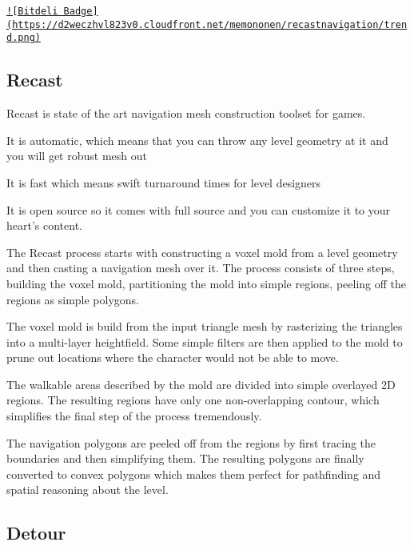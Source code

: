\href{https://bitdeli.com/free}{\tt !\mbox{[}Bitdeli Badge\mbox{]}(https\+://d2weczhvl823v0.\+cloudfront.\+net/memononen/recastnavigation/trend.\+png)}



\subsection*{Recast}

Recast is state of the art navigation mesh construction toolset for games.


\begin{DoxyItemize}
\item It is automatic, which means that you can throw any level geometry at it and you will get robust mesh out
\item It is fast which means swift turnaround times for level designers
\item It is open source so it comes with full source and you can customize it to your heart's content.
\end{DoxyItemize}

The Recast process starts with constructing a voxel mold from a level geometry and then casting a navigation mesh over it. The process consists of three steps, building the voxel mold, partitioning the mold into simple regions, peeling off the regions as simple polygons.


\begin{DoxyEnumerate}
\item The voxel mold is build from the input triangle mesh by rasterizing the triangles into a multi-\/layer heightfield. Some simple filters are then applied to the mold to prune out locations where the character would not be able to move.
\item The walkable areas described by the mold are divided into simple overlayed 2\+D regions. The resulting regions have only one non-\/overlapping contour, which simplifies the final step of the process tremendously.
\item The navigation polygons are peeled off from the regions by first tracing the boundaries and then simplifying them. The resulting polygons are finally converted to convex polygons which makes them perfect for pathfinding and spatial reasoning about the level.
\end{DoxyEnumerate}

\subsection*{Detour}

